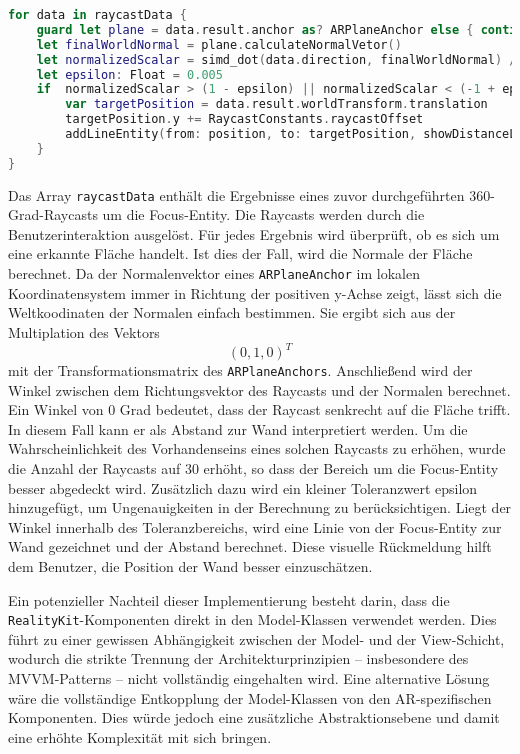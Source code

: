 \begin{lstlisting}[language=Swift]
for data in raycastData {
    guard let plane = data.result.anchor as? ARPlaneAnchor else { continue }
    let finalWorldNormal = plane.calculateNormalVetor()
    let normalizedScalar = simd_dot(data.direction, finalWorldNormal) / (simd_length(finalWorldNormal) * simd_length(data.direction))
    let epsilon: Float = 0.005  
    if  normalizedScalar > (1 - epsilon) || normalizedScalar < (-1 + epsilon) {
        var targetPosition = data.result.worldTransform.translation
        targetPosition.y += RaycastConstants.raycastOffset
        addLineEntity(from: position, to: targetPosition, showDistanceLabel: true)
    }
}
\end{lstlisting}

Das Array \texttt{raycastData} enthält die Ergebnisse eines zuvor durchgeführten 360-Grad-Raycasts um die Focus-Entity. Die Raycasts werden durch die Benutzerinteraktion ausgelöst. Für jedes Ergebnis wird überprüft, ob es sich um eine erkannte Fläche handelt. Ist dies der Fall, wird die Normale der Fläche berechnet. Da der Normalenvektor eines \texttt{ARPlaneAnchor} im lokalen Koordinatensystem immer in Richtung der positiven y-Achse zeigt, lässt sich die Weltkoodinaten der Normalen einfach bestimmen. Sie ergibt sich aus der Multiplation des Vektors \[ (0,1,0)^T \] mit der Transformationsmatrix des \texttt{ARPlaneAnchors}. Anschließend wird der Winkel zwischen dem Richtungsvektor des Raycasts und der Normalen berechnet. Ein Winkel von 0 Grad bedeutet, dass der Raycast senkrecht auf die Fläche trifft. In diesem Fall kann er als Abstand zur Wand interpretiert werden. Um die Wahrscheinlichkeit des Vorhandenseins eines solchen Raycasts zu erhöhen, wurde die Anzahl der Raycasts auf 30 erhöht, so dass der Bereich um die Focus-Entity besser abgedeckt wird. Zusätzlich dazu wird ein kleiner Toleranzwert epsilon hinzugefügt, um Ungenauigkeiten in der Berechnung zu berücksichtigen. Liegt der Winkel innerhalb des Toleranzbereichs, wird eine Linie von der Focus-Entity zur Wand gezeichnet und der Abstand berechnet. Diese visuelle Rückmeldung hilft dem Benutzer, die Position der Wand besser einzuschätzen.

Ein potenzieller Nachteil dieser Implementierung besteht darin, dass die \texttt{RealityKit}-Komponenten direkt in den Model-Klassen verwendet werden. Dies führt zu einer gewissen Abhängigkeit zwischen der Model- und der View-Schicht, wodurch die strikte Trennung der Architekturprinzipien – insbesondere des MVVM-Patterns – nicht vollständig eingehalten wird. Eine alternative Lösung wäre die vollständige Entkopplung der Model-Klassen von den AR-spezifischen Komponenten. Dies würde jedoch eine zusätzliche Abstraktionsebene und damit eine erhöhte Komplexität mit sich bringen.

